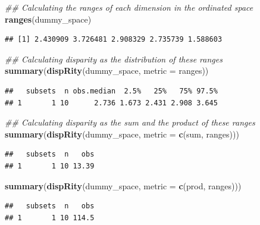 \documentclass[]{book}
\newenvironment{Shaded}{\begin{snugshade}}{\end{snugshade}}
\newcommand{\CommentTok}[1]{\textcolor[rgb]{0.56,0.35,0.01}{\textit{#1}}}
\newcommand{\DataTypeTok}[1]{\textcolor[rgb]{0.13,0.29,0.53}{#1}}
\newcommand{\KeywordTok}[1]{\textcolor[rgb]{0.13,0.29,0.53}{\textbf{#1}}}
\newcommand{\NormalTok}[1]{#1}
\begin{document}
\begin{Shaded}
\begin{Highlighting}[]
\CommentTok{## Calculating the ranges of each dimension in the ordinated space}
\KeywordTok{ranges}\NormalTok{(dummy_space)}
\end{Highlighting}
\end{Shaded}

\begin{verbatim}
## [1] 2.430909 3.726481 2.908329 2.735739 1.588603
\end{verbatim}

\begin{Shaded}
\begin{Highlighting}[]
\CommentTok{## Calculating disparity as the distribution of these ranges}
\KeywordTok{summary}\NormalTok{(}\KeywordTok{dispRity}\NormalTok{(dummy_space, }\DataTypeTok{metric =}\NormalTok{ ranges))}
\end{Highlighting}
\end{Shaded}

\begin{verbatim}
##   subsets  n obs.median  2.5%   25%   75% 97.5%
## 1       1 10      2.736 1.673 2.431 2.908 3.645
\end{verbatim}

\begin{Shaded}
\begin{Highlighting}[]
\CommentTok{## Calculating disparity as the sum and the product of these ranges}
\KeywordTok{summary}\NormalTok{(}\KeywordTok{dispRity}\NormalTok{(dummy_space, }\DataTypeTok{metric =} \KeywordTok{c}\NormalTok{(sum, ranges)))}
\end{Highlighting}
\end{Shaded}

\begin{verbatim}
##   subsets  n   obs
## 1       1 10 13.39
\end{verbatim}

\begin{Shaded}
\begin{Highlighting}[]
\KeywordTok{summary}\NormalTok{(}\KeywordTok{dispRity}\NormalTok{(dummy_space, }\DataTypeTok{metric =} \KeywordTok{c}\NormalTok{(prod, ranges)))}
\end{Highlighting}
\end{Shaded}

\begin{verbatim}
##   subsets  n   obs
## 1       1 10 114.5
\end{verbatim}
\end{document}
